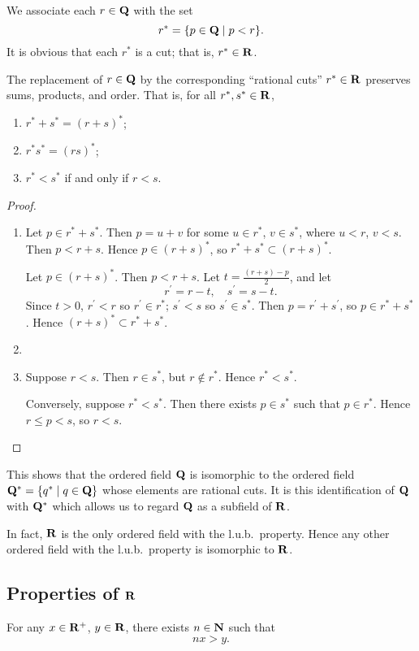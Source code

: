 We associate each $r\in\mathbf Q$ with the set
\[r^*=\{p\in\mathbf Q\mid p<r\}.\]
It is obvious that each $r^*$ is a cut; that is, $r^*\in\mathbf R$.

\begin{proposition}
The replacement of $r\in\mathbf Q$ by the corresponding ``rational cuts'' $r^*\in\mathbf R$ preserves sums, products, and order. That is, for all $r^*,s^*\in\mathbf R$,
\begin{enumerate}[label=(\roman*)]
\item $r^*+s^*=(r+s)^*$;
\item $r^*s^*=(rs)^*$;
\item $r^*<s^*$ if and only if $r<s$.
\end{enumerate}
\end{proposition}

\begin{proof} \
\begin{enumerate}[label=(\roman*)]
\item Let $p\in r^*+s^*$. Then $p=u+v$ for some $u\in r^*$, $v\in s^*$, where $u<r$, $v<s$. Then $p<r+s$. Hence $p\in(r+s)^*$, so $r^*+s^*\subset(r+s)^*$.

Let $p\in(r+s)^*$. Then $p<r+s$. Let $t=\frac{(r+s)-p}{2}$, and let
\[r^\prime=r-t,\quad s^\prime=s-t.\]
Since $t>0$, $r^\prime<r$ so $r^\prime\in r^*$; $s^\prime<s$ so $s^\prime\in s^*$. Then $p=r^\prime+s^\prime$, so $p\in r^*+s^*$. Hence $(r+s)^*\subset r^*+s^*$.

\item 
\item Suppose $r<s$. Then $r\in s^*$, but $r\notin r^*$. Hence $r^*<s^*$.

Conversely, suppose $r^*<s^*$. Then there exists $p\in s^*$ such that $p\in r^*$. Hence $r\le p<s$, so $r<s$.
\end{enumerate}
\end{proof}

This shows that the ordered field $\mathbf Q$ is isomorphic to the ordered field $\mathbf Q^*=\{q^*\mid q\in\mathbf Q\}$ whose elements are rational cuts. It is this identification of $\mathbf Q$ with $\mathbf Q^*$ which allows us to regard $\mathbf Q$ as a subfield of $\RR$.

\begin{remark}
In fact, $\RR$ is the only ordered field with the l.u.b.\ property. Hence any other ordered field with the l.u.b.\ property is isomorphic to $\RR$.
\end{remark}

\subsection{Properties of $\RR$}
\begin{proposition}[$\RR$ is archimedian]
For any $x\in\mathbf R^+$, $y\in\mathbf R$, there exists $n\in\mathbf N$ such that
\[nx>y.\]
\end{proposition}

